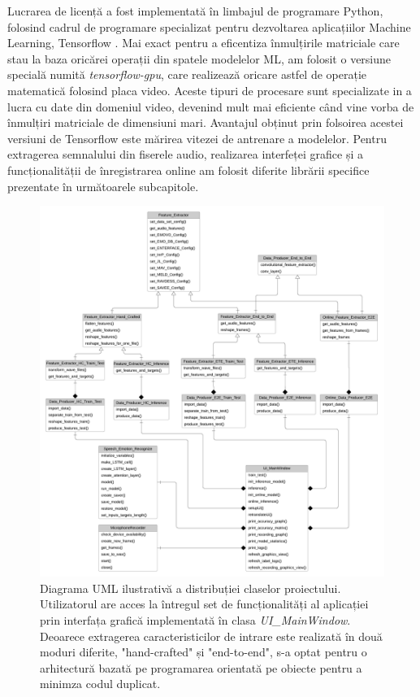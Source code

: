 \documentclass[a4paper,12pt]{book}
\begin{document}
				Lucrarea de licență a fost implementată în limbajul de programare Python, folosind cadrul de programare specializat pentru dezvoltarea aplicațiilor Machine Learning, Tensorflow \cite{tensorflow}. Mai exact pentru a eficentiza înmulțirile matriciale care stau la baza oricărei operații din spatele modelelor ML, am folosit o versiune specială numită \textit{tensorflow-gpu}, care realizează oricare astfel de operație matematică folosind placa video. Aceste tipuri de procesare sunt specializate in a lucra cu date din domeniul video, devenind mult mai eficiente când vine vorba de înmulțiri matriciale de dimensiuni mari. Avantajul obținut prin folsoirea acestei versiuni de Tensorflow este mărirea  vitezei de antrenare a modelelor. Pentru extragerea semnalului din fiserele audio, realizarea interfeței grafice și a funcționalității de înregistrarea online am folosit diferite librării specifice prezentate în următoarele subcapitole. \par
				\begin{figure}[p]
					\hspace*{-1,5cm}
					\centering
					\includegraphics[scale=0.56]{uml}
					\caption{Diagrama UML ilustrativă a distribuției claselor proiectului. Utilizatorul are acces la întregul set de funcționalități al aplicației prin interfața grafică implementată în clasa \textit{UI\_MainWindow}.  Deoarece extragerea caracteristicilor de intrare este realizată în două moduri diferite, "hand-crafted" și "end-to-end", s-a optat pentru o arhitectură bazată pe programarea orientată pe obiecte pentru a minimza codul duplicat.}
					\label{fig:uml}
				\end{figure} 
			
\end{document}
